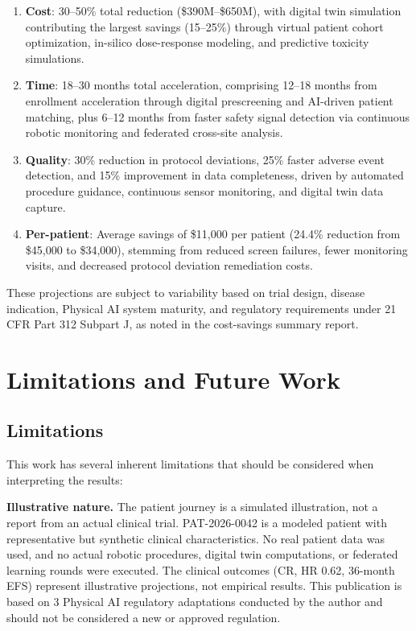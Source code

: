 \documentclass{article}
\begin{document}
\begin{enumerate}[leftmargin=*]
\item \textbf{Cost}: 30--50\% total reduction (\$390M--\$650M), with digital twin simulation contributing the largest savings (15--25\%) through virtual patient cohort optimization, in-silico dose-response modeling, and predictive toxicity simulations.

\item \textbf{Time}: 18--30 months total acceleration, comprising 12--18 months from enrollment acceleration through digital prescreening and AI-driven patient matching, plus 6--12 months from faster safety signal detection via continuous robotic monitoring and federated cross-site analysis.

\item \textbf{Quality}: 30\% reduction in protocol deviations, 25\% faster adverse event detection, and 15\% improvement in data completeness, driven by automated procedure guidance, continuous sensor monitoring, and digital twin data capture.

\item \textbf{Per-patient}: Average savings of \$11,000 per patient (24.4\% reduction from \$45,000 to \$34,000), stemming from reduced screen failures, fewer monitoring visits, and decreased protocol deviation remediation costs.
\end{enumerate}

These projections are subject to variability based on trial design, disease indication, Physical AI system maturity, and regulatory requirements under 21 CFR Part 312 Subpart J, as noted in the cost-savings summary report.

\section{Limitations and Future Work}
\label{sec:limitations}

\subsection{Limitations}

This work has several inherent limitations that should be considered when interpreting the results:

\textbf{Illustrative nature.} The patient journey is a simulated illustration, not a report from an actual clinical trial. PAT-2026-0042 is a modeled patient with representative but synthetic clinical characteristics. No real patient data was used, and no actual robotic procedures, digital twin computations, or federated learning rounds were executed. The clinical outcomes (CR, HR 0.62, 36-month EFS) represent illustrative projections, not empirical results. This publication is based on 3 Physical AI regulatory adaptations conducted by the author and should not be considered a new or approved regulation.
\end{document}
